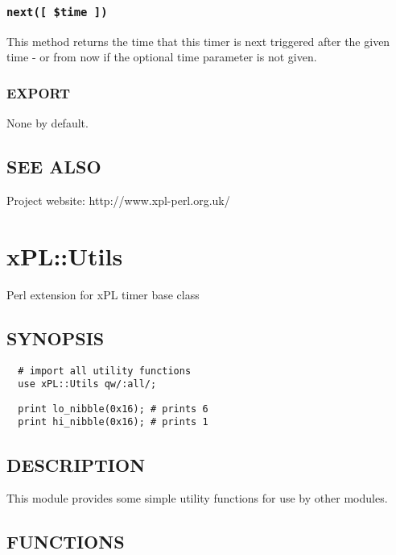 \subsubsection*{\texttt{next([ \$time ])}\label{xPL::Timer::sunset_next_time_}}


This method returns the time that this timer is next triggered after
the given time - or from now if the optional time parameter is not
given.

\subsubsection*{EXPORT\label{xPL::Timer::sunset_EXPORT}}


None by default.

\subsection*{SEE ALSO\label{xPL::Timer::sunset_SEE_ALSO}}


Project website: http://www.xpl-perl.org.uk/

\section{xPL::Utils\label{xPL::Utils}}


Perl extension for xPL timer base class

\subsection*{SYNOPSIS\label{xPL::Utils_SYNOPSIS}}
\begin{verbatim}
  # import all utility functions
  use xPL::Utils qw/:all/;
\end{verbatim}
\begin{verbatim}
  print lo_nibble(0x16); # prints 6
  print hi_nibble(0x16); # prints 1
\end{verbatim}
\subsection*{DESCRIPTION\label{xPL::Utils_DESCRIPTION}}


This module provides some simple utility functions for use by other
modules.

\subsection*{FUNCTIONS\label{xPL::Utils_FUNCTIONS}}
